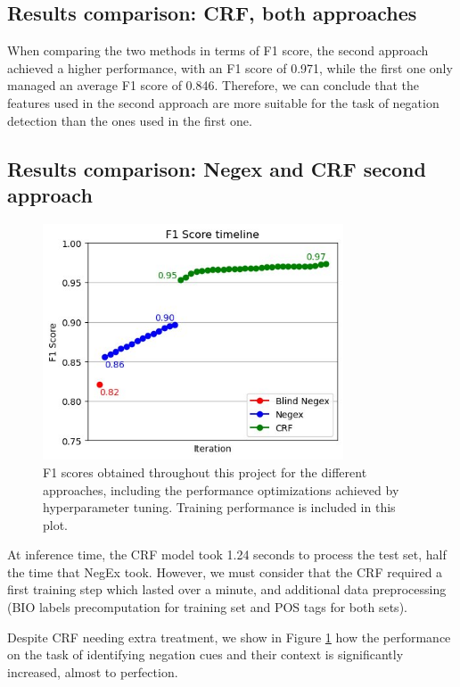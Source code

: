 \documentclass{article}
\begin{document}
\subsection*{Results comparison: CRF, both approaches}
When comparing the two methods in terms of F1 score, the second approach achieved a higher performance,
with an F1 score of 0.971, while the first one only managed an average F1 score of 0.846. Therefore, we
can conclude that the features used in the second approach are more suitable for the task of negation
detection than the ones used in the first one.

\subsection*{Results comparison: Negex and CRF second approach}

\begin{figure}[!t]
	\centering
	\includegraphics[height=7cm]{images/score_timeline.jpg}
	\captionsetup{width=0.9\textwidth}
	\caption{F1 scores obtained throughout this project for the different approaches, including the
	performance optimizations achieved by hyperparameter tuning. Training performance is included in
	this plot.}
	\label{fig:score_timeline}
\end{figure}

At inference time, the CRF model took 1.24 seconds to process the test set, half the time that NegEx took.
However, we must consider that the CRF required a first training step which lasted over a minute, and additional
data preprocessing (BIO labels precomputation for training set and POS tags for both sets).

Despite CRF needing extra treatment, we show in Figure \ref{fig:score_timeline} how the performance on the
task of identifying negation cues and their context is significantly increased, almost to perfection.
\end{document}
